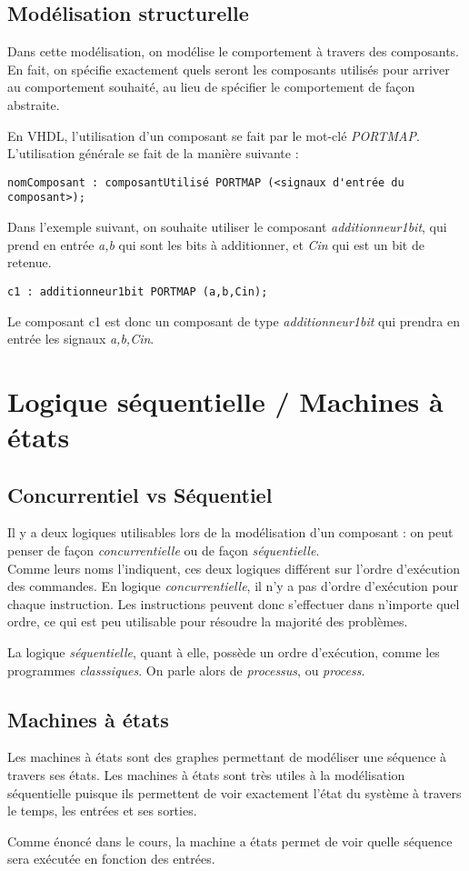 \documentclass[11.5pt]{report}
\begin{document}
\subsection{Modélisation structurelle}
Dans cette modélisation, on modélise le comportement à travers des composants.
En fait, on spécifie exactement quels seront les composants utilisés pour arriver au comportement souhaité, au lieu de spécifier le comportement de façon abstraite.
\par
En VHDL, l'utilisation d'un composant se fait par le mot-clé \emph{PORTMAP}.\\
L'utilisation générale se fait de la manière suivante :
\begin{verbatim}
nomComposant : composantUtilisé PORTMAP (<signaux d'entrée du composant>);
\end{verbatim}
Dans l'exemple suivant, on souhaite utiliser le composant \emph{additionneur1bit}, qui prend en entrée \emph{a,b} qui sont les bits à additionner, et \emph{Cin} qui est un bit de retenue.
\begin{verbatim}
c1 : additionneur1bit PORTMAP (a,b,Cin);
\end{verbatim}
Le composant c1 est donc un composant de type \emph{additionneur1bit} qui prendra en entrée les signaux \emph{a,b,Cin}.

\section{Logique séquentielle / Machines à états}
\subsection{Concurrentiel vs Séquentiel}
Il y a deux logiques utilisables lors de la modélisation d'un composant : on peut penser de façon \emph{concurrentielle} ou de façon \emph{séquentielle}.\\
Comme leurs noms l'indiquent, ces deux logiques différent sur l'ordre d'exécution des commandes.
En logique \emph{concurrentielle}, il n'y a pas d'ordre d'exécution pour chaque instruction.
Les instructions peuvent donc s'effectuer dans n'importe quel ordre, ce qui est peu utilisable pour résoudre la majorité des problèmes.
\par
La logique \emph{séquentielle}, quant à elle, possède un ordre d'exécution, comme les programmes \emph{classsiques}.
On parle alors de \emph{processus}, ou \emph{process}.

\subsection{Machines à états}
Les machines à états sont des graphes permettant de modéliser une séquence à travers ses états.
Les machines à états sont très utiles à la modélisation séquentielle puisque ils permettent de voir exactement l'état du système à travers le temps, les entrées et ses sorties.
\par
Comme énoncé dans le cours, la machine a états permet de voir quelle séquence sera exécutée en fonction des entrées.
\end{document}
